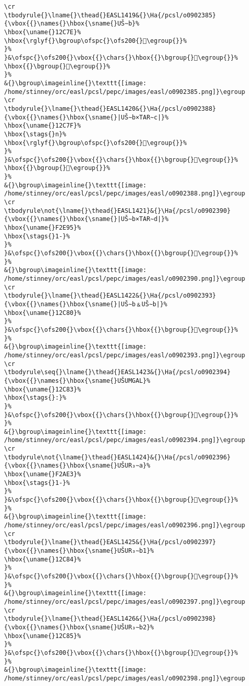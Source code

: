 \begin{verbatim}
\cr
\tbodyrule{}\lname{}\thead{}EASL1419&{}\Ha{/pcsl/o0902385}{\vbox{{}\names{}\hbox{\sname{}UŠ∼b}%
\hbox{\uname{}12C7E}%
\hbox{\rglyf{}\bgroup\ofspc{}\ofs200{}𒱾\egroup{}}%
}%
}&\ofspc{}\ofs200{}\vbox{{}\chars{}\hbox{{}\bgroup{}𒱾\egroup{}}%
\hbox{{}\bgroup{}𒲁\egroup{}}%
}%
&{}\bgroup\imageinline{}\texttt{[image: /home/stinney/orc/easl/pcsl/pepc/images/easl/o0902385.png]}\egroup
\cr
\tbodyrule{}\lname{}\thead{}EASL1420&{}\Ha{/pcsl/o0902388}{\vbox{{}\names{}\hbox{\sname{}|UŠ∼b×TAR∼c|}%
\hbox{\uname{}12C7F}%
\hbox{\stags{}n}%
\hbox{\rglyf{}\bgroup\ofspc{}\ofs200{}𒱿\egroup{}}%
}%
}&\ofspc{}\ofs200{}\vbox{{}\chars{}\hbox{{}\bgroup{}𒲂\egroup{}}%
\hbox{{}\bgroup{}𒱿\egroup{}}%
}%
&{}\bgroup\imageinline{}\texttt{[image: /home/stinney/orc/easl/pcsl/pepc/images/easl/o0902388.png]}\egroup
\cr
\tbodyrule\not{\lname{}\thead{}EASL1421}&{}\Ha{/pcsl/o0902390}{\vbox{{}\names{}\hbox{\sname{}|UŠ∼b×TAR∼d|}%
\hbox{\uname{}F2E95}%
\hbox{\stags{}1-}%
}%
}&\ofspc{}\ofs200{}\vbox{{}\chars{}\hbox{{}\bgroup{}󲺕\egroup{}}%
}%
&{}\bgroup\imageinline{}\texttt{[image: /home/stinney/orc/easl/pcsl/pepc/images/easl/o0902390.png]}\egroup
\cr
\tbodyrule{}\lname{}\thead{}EASL1422&{}\Ha{/pcsl/o0902393}{\vbox{{}\names{}\hbox{\sname{}|UŠ∼b﹠UŠ∼b|}%
\hbox{\uname{}12C80}%
}%
}&\ofspc{}\ofs200{}\vbox{{}\chars{}\hbox{{}\bgroup{}𒲀\egroup{}}%
}%
&{}\bgroup\imageinline{}\texttt{[image: /home/stinney/orc/easl/pcsl/pepc/images/easl/o0902393.png]}\egroup
\cr
\tbodyrule\seq{}\lname{}\thead{}EASL1423&{}\Ha{/pcsl/o0902394}{\vbox{{}\names{}\hbox{\sname{}UŠUMGAL}%
\hbox{\uname{}12C83}%
\hbox{\stags{}:}%
}%
}&\ofspc{}\ofs200{}\vbox{{}\chars{}\hbox{{}\bgroup{}𒲃\egroup{}}%
}%
&{}\bgroup\imageinline{}\texttt{[image: /home/stinney/orc/easl/pcsl/pepc/images/easl/o0902394.png]}\egroup
\cr
\tbodyrule\not{\lname{}\thead{}EASL1424}&{}\Ha{/pcsl/o0902396}{\vbox{{}\names{}\hbox{\sname{}UŠUR₃∼a}%
\hbox{\uname{}F2AE3}%
\hbox{\stags{}1-}%
}%
}&\ofspc{}\ofs200{}\vbox{{}\chars{}\hbox{{}\bgroup{}󲫣\egroup{}}%
}%
&{}\bgroup\imageinline{}\texttt{[image: /home/stinney/orc/easl/pcsl/pepc/images/easl/o0902396.png]}\egroup
\cr
\tbodyrule{}\lname{}\thead{}EASL1425&{}\Ha{/pcsl/o0902397}{\vbox{{}\names{}\hbox{\sname{}UŠUR₃∼b1}%
\hbox{\uname{}12C84}%
}%
}&\ofspc{}\ofs200{}\vbox{{}\chars{}\hbox{{}\bgroup{}𒲄\egroup{}}%
}%
&{}\bgroup\imageinline{}\texttt{[image: /home/stinney/orc/easl/pcsl/pepc/images/easl/o0902397.png]}\egroup
\cr
\tbodyrule{}\lname{}\thead{}EASL1426&{}\Ha{/pcsl/o0902398}{\vbox{{}\names{}\hbox{\sname{}UŠUR₃∼b2}%
\hbox{\uname{}12C85}%
}%
}&\ofspc{}\ofs200{}\vbox{{}\chars{}\hbox{{}\bgroup{}𒲅\egroup{}}%
}%
&{}\bgroup\imageinline{}\texttt{[image: /home/stinney/orc/easl/pcsl/pepc/images/easl/o0902398.png]}\egroup

\end{verbatim}

